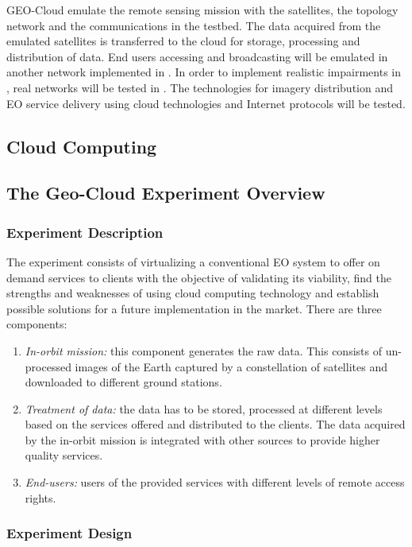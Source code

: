 GEO-Cloud  emulate the remote sensing mission with the satellites, the
topology network and the communications in the \vw testbed. The data
acquired from the emulated satellites is transferred to the \bonfire cloud
for storage, processing and distribution of data. End users accessing and
broadcasting will be emulated in another network implemented in \vw. In
order to implement realistic impairments in \vw, real networks will be
tested in \pl.  The technologies for imagery distribution and \acs{EO}
service delivery using cloud technologies and Internet protocols will be tested.

\subsection{Cloud Computing}


\subsection{The Geo-Cloud Experiment Overview}


\subsubsection{Experiment Description}

The experiment consists of virtualizing a conventional \acs{EO} system to offer on
demand services to clients with the objective of validating its viability, find
the strengths and weaknesses of using cloud computing technology and establish
possible solutions for a future implementation in the market. There are three
components:
\begin{enumerate}
\item \emph{In-orbit mission:} this component generates the raw data. This consists of un-processed images of the Earth captured by a constellation of satellites and downloaded to different ground stations.
\item \emph{Treatment of data:} the data has to be stored, processed at different levels based on the services offered and distributed to the clients. The data acquired by the in-orbit mission is integrated with other sources to provide higher quality services.
\item \emph{End-users:} users of the provided services with different levels of remote access rights.

\end{enumerate}


\subsubsection{Experiment Design}



